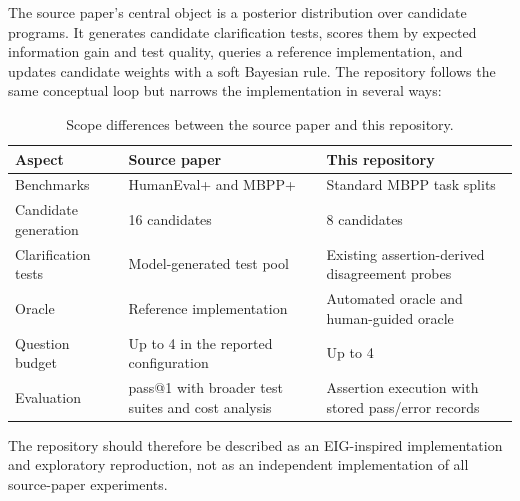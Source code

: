 The source paper's central object is a posterior distribution over candidate programs. It generates candidate clarification tests, scores them by expected information gain and test quality, queries a reference implementation, and updates candidate weights with a soft Bayesian rule. The repository follows the same conceptual loop but narrows the implementation in several ways:

\begin{table}[ht]
\centering
\caption{Scope differences between the source paper and this repository.}
\label{tab:scope}
\begin{tabular}{p{}p{}p{}}
\toprule
Aspect & Source paper & This repository \\
\midrule
Benchmarks & HumanEval+ and MBPP+ & Standard MBPP task splits \\
Candidate generation & 16 candidates & 8 candidates \\
Clarification tests & Model-generated test pool & Existing assertion-derived disagreement probes \\
Oracle & Reference implementation & Automated oracle and human-guided oracle \\
Question budget & Up to 4 in the reported configuration & Up to 4 \\
Evaluation & pass@1 with broader test suites and cost analysis & Assertion execution with stored pass/error records \\
\bottomrule
\end{tabular}
\end{table}

The repository should therefore be described as an EIG-inspired implementation and exploratory reproduction, not as an independent implementation of all source-paper experiments.
